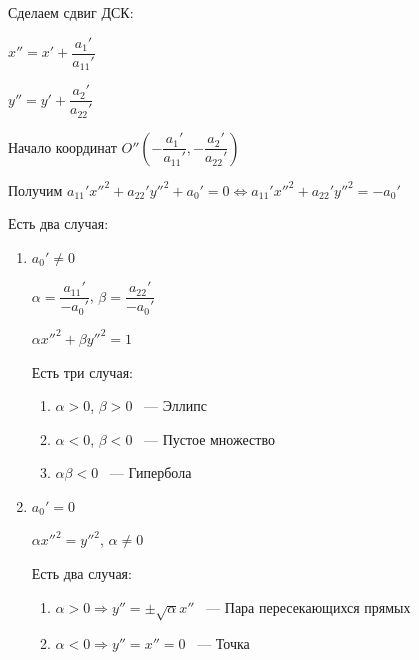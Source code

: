 \begin{enumerate}
\begin{enumerate}
                    Сделаем сдвиг ДСК:

                    \(x'' = x' + \dfrac{a_1'}{a_{11}'}\)

                    \(y'' = y' + \dfrac{a_2'}{a_{22}'}\)

                    Начало координат \(O''\left(-\dfrac{a_1'}{a_{11}'}, -\dfrac{a_2'}{a_{22}'}\right)\)

                    Получим \(a_{11}' x''^2 + a_{22}' y''^2 + a_0' = 0 \Leftrightarrow a_{11}' x''^2 + a_{22}' y''^2 = -a_0'\)

                    Есть два случая:
                    \begin{enumerate}
                        \item \(a_0' \neq 0\)

                              \(\alpha = \dfrac{a_{11}'}{-a_0'}\), \(\beta = \dfrac{a_{22}'}{-a_0'}\)

                              \(\alpha x''^2 + \beta y''^2 = 1\)

                              Есть три случая:
                              \begin{enumerate}
                                  \item \(\alpha > 0\), \(\beta > 0\) ~--- Эллипс

                                  \item \(\alpha < 0\), \(\beta < 0\) ~--- Пустое множество

                                  \item \(\alpha \beta < 0\) ~---  Гипербола
                              \end{enumerate}
                        \item \(a_0' = 0\)

                              \(\alpha x''^2 = y''^2\), \(\alpha \neq 0\)

                              Есть два случая:
                              \begin{enumerate}
                                  \item \(\alpha > 0 \Rightarrow y'' = \pm \sqrt \alpha x''\) ~--- Пара пересекающихся прямых

                                  \item \(\alpha < 0 \Rightarrow y'' = x'' = 0\) ~--- Точка
                              \end{enumerate}
                    \end{enumerate}


\end{enumerate}
\end{enumerate}
